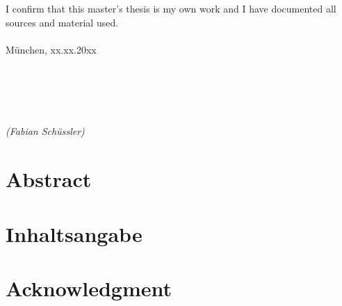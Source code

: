 \documentclass[12pt]{report}
\begin{document}
\newpage	
\thispagestyle{empty}
\hoffset=0mm
\vspace*{\fill}
\noindent I confirm that this master's thesis is my own work and I have documented all sources and material used.\\\\
München, xx.xx.20xx\\\\\\\\\\\\
\noindent \textit{(Fabian Schüssler)}

\newpage
\thispagestyle{empty}
\null

\newpage
\thispagestyle{empty}
\hoffset=0mm
\section*{Abstract}	
\begin{spacing}{1.2}

\end{spacing}
 
\newpage
\thispagestyle{empty}
\hoffset=0mm
\section*{Inhaltsangabe}
\begin{spacing}{1.2}

\end{spacing}

\newpage
\thispagestyle{empty}
\hoffset=0mm
\section*{Acknowledgment}	
\begin{spacing}{1.2}

\end{spacing}

\newpage
\setcounter{page}{1}
\hoffset=0mm
\fboxsep 0mm

\tableofcontents
\setcounter{tocdepth}{2}

\listoffigures
{}

\listoftables
{}

\printglossary[type=\acronymtype,style=long ,title=Abbreviations, toctitle=Abbreviations,nonumberlist]
\printglossary[type=symbolslist,style=long ,title=Symbols, nonumberlist]

\newpage
\setlength{\baselineskip}{3ex}
\begin{spacing}{1.15}






\end{spacing}

\newpage


\newpage


\end{document}

